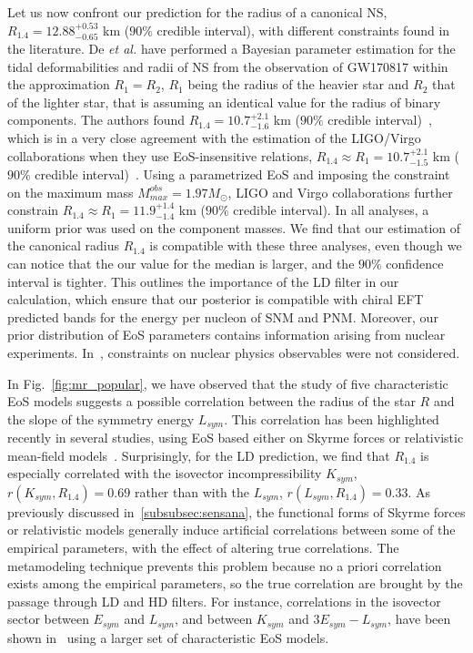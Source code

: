Let us now confront our prediction for the radius of a canonical NS,
$R_{1.4}=12.88_{-0.65}^{+0.53}$ km ($90\%$ credible interval), with different 
constraints found in the literature.
De \textit{et al.} have performed a Bayesian parameter estimation for the tidal
deformabilities and radii of NS from the observation of GW170817 within the
approximation $R_1 = R_2$, $R_1$ being the radius of the heavier star and 
$R_2$ that of the lighter star, that is assuming an identical value for the 
radius of binary components. 
The authors found $R_{1.4} = 10.7_{-1.6}^{+2.1}$ km ($90\%$ 
credible interval)~\cite{De2018}, which is in a very close agreement with the 
estimation of the LIGO/Virgo collaborations when they use EoS-insensitive 
relations, $R_{1.4} \approx R_1 = 10.7_{-1.5}^{+2.1}$ km ($90\%$ credible
interval)~\cite{GW1}. Using a parametrized EoS and imposing the constraint on
the maximum mass $M_{max}^{obs}=1.97M_\odot$, LIGO and Virgo collaborations 
further constrain $R_{1.4} \approx R_1 = 11.9_{-1.4}^{+1.4}$ km ($90\%$ 
credible interval). In all analyses, a uniform prior was used on the component 
masses. 
We find that our estimation of the canonical radius $R_{1.4}$ is 
compatible with these three analyses, even though we can notice that the our
value for the median is larger, and the $90\%$ confidence interval is 
tighter. This outlines the importance of the LD filter in our calculation, 
which ensure that our posterior is compatible with chiral EFT predicted bands 
for the energy per nucleon of SNM and PNM. Moreover, our prior distribution of 
EoS parameters contains information arising from nuclear experiments.
In~\cite{De2018,GW1}, constraints on nuclear physics observables were not 
considered.

In Fig.~\ref{fig:mr_popular}, we have observed that the study of five
characteristic EoS models suggests a possible correlation between 
the radius of the star $R$ and the slope of the symmetry energy $L_{sym}$. 
This correlation has 
been highlighted recently in several studies, using EoS based either on
Skyrme forces or relativistic mean-field models~\cite{Alam2016,Ji2019,Hu2020}. 
Surprisingly, for the LD prediction, we find that $R_{1.4}$ is especially 
correlated with the isovector incompressibility $K_{sym}$, 
$r(K_{sym},R_{1.4})=0.69$ rather than with the $L_{sym}$, 
$r(L_{sym},R_{1.4})=0.33$. As previously discussed in~\ref{subsubsec:sensana}, 
the functional forms of Skyrme forces or relativistic models generally induce 
artificial correlations between some of the empirical parameters, with the 
effect of altering true correlations. The metamodeling technique prevents this 
problem because no a priori correlation exists among the empirical parameters, 
so the true correlation are brought by the passage through LD and HD filters. 
For instance, correlations in the isovector sector between $E_{sym}$ and 
$L_{sym}$, and between $K_{sym}$ and $3E_{sym}-L_{sym}$, have been shown 
in~\cite{Mondal2017,Margueron2019} using a larger set of characteristic EoS
models.

